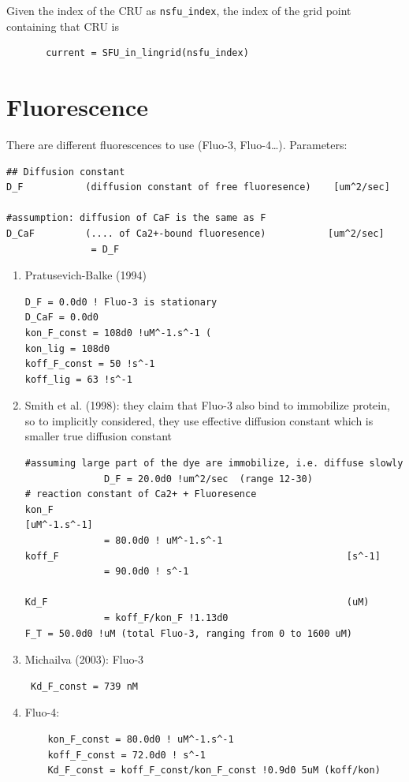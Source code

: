 Given the index of the CRU as \verb!nsfu_index!, the index of the grid
point containing that CRU is 
\begin{verbatim}
       current = SFU_in_lingrid(nsfu_index)
\end{verbatim}



\section{Fluorescence}
\label{sec:fluorescence}

There are different fluorescences to use (Fluo-3, Fluo-4\ldots).
Parameters:
\begin{verbatim}
## Diffusion constant
D_F           (diffusion constant of free fluoresence)    [um^2/sec]

#assumption: diffusion of CaF is the same as F
D_CaF         (.... of Ca2+-bound fluoresence)           [um^2/sec]
               = D_F
\end{verbatim}
\begin{enumerate}
  \item Pratusevich-Balke (1994)
  \begin{verbatim}
D_F = 0.0d0 ! Fluo-3 is stationary
D_CaF = 0.0d0
kon_F_const = 108d0 !uM^-1.s^-1 (
kon_lig = 108d0
koff_F_const = 50 !s^-1
koff_lig = 63 !s^-1  
  \end{verbatim}
  
  \item Smith et al. (1998): they claim that Fluo-3 also bind to immobilize
  protein, so to implicitly considered, they use effective diffusion constant
  which is smaller true diffusion constant 
  \begin{verbatim}
#assuming large part of the dye are immobilize, i.e. diffuse slowly
              D_F = 20.0d0 !um^2/sec  (range 12-30)
# reaction constant of Ca2+ + Fluoresence
kon_F                                                    [uM^-1.s^-1]
              = 80.0d0 ! uM^-1.s^-1
koff_F                                                   [s^-1]
              = 90.0d0 ! s^-1

Kd_F                                                     (uM)
              = koff_F/kon_F !1.13d0   
F_T = 50.0d0 !uM (total Fluo-3, ranging from 0 to 1600 uM)
  \end{verbatim}

 \item Michailva (2003): Fluo-3 
\begin{verbatim}
 Kd_F_const = 739 nM
\end{verbatim}

  \item Fluo-4:
\begin{verbatim}
    kon_F_const = 80.0d0 ! uM^-1.s^-1
    koff_F_const = 72.0d0 ! s^-1
    Kd_F_const = koff_F_const/kon_F_const !0.9d0 5uM (koff/kon)  
\end{verbatim}
\end{enumerate}

